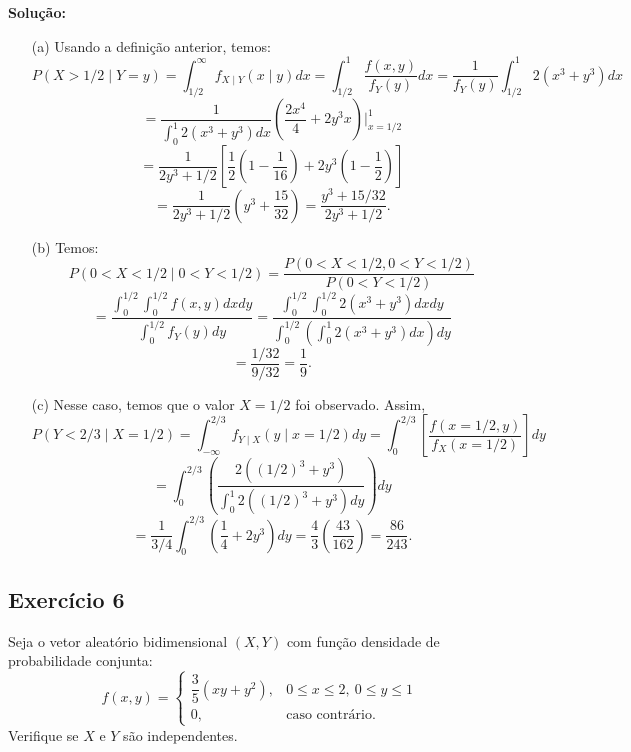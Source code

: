 \documentclass{article}
\begin{document}
\vspace{0.5cm}
\textbf{Solução:}
\begin{enumerate}
    \item[(a)] Usando a definição anterior, temos:
        $$
        P(X > 1/2 \mid Y = y) = \int_{1/2}^{\infty} f_{X\mid Y}(x\mid y) dx
        = \int_{1/2}^{1} \frac{f(x,y)}{f_Y(y)} dx
        = \frac{1}{f_Y(y)} \int_{1/2}^{1} 2(x^3 + y^3) dx
        $$
        $$
        = \frac{1}{\int_0^1 2(x^3 + y^3) dx} \left(\frac{2x^4}{4} + 2y^3x\right)\bigg|_{x=1/2}^{1}
        $$
        $$
        = \frac{1}{2y^3 + 1/2}\left[ \frac12\left(1 - \frac{1}{16}\right) + 2y^3\left(1 - \frac12\right) \right]
        $$
        $$
        = \frac{1}{2y^3 + 1/2}\left( y^3 + \frac{15}{32} \right)
        = \frac{y^3 + 15/32}{2y^3 + 1/2}.
        $$
    \item[(b)] Temos:
        $$
        P(0 < X < 1/2 \mid 0 < Y < 1/2)
        = \frac{P(0 < X < 1/2, 0 < Y < 1/2)}{P(0 < Y < 1/2)}
        $$
        $$
        = \frac{\int_0^{1/2}\int_0^{1/2} f(x,y) dx dy}{\int_0^{1/2} f_Y(y) dy}
        = \frac{\int_0^{1/2}\int_0^{1/2} 2(x^3 + y^3) dx dy}
        {\int_0^{1/2} \left(\int_0^1 2(x^3 + y^3) dx\right) dy}
        $$
        $$
        = \frac{1/32}{9/32}
        = \frac19.
        $$
    \item[(c)] Nesse caso, temos que o valor $X = 1/2$ foi observado. Assim,
        $$
        P(Y < 2/3 \mid X = 1/2)
        = \int_{-\infty}^{2/3} f_{Y\mid X}(y\mid x=1/2) dy
        = \int_0^{2/3} 
        \left[\frac{f(x=1/2,y)}{f_X(x=1/2)}\right] dy
        $$
        $$
        = \int_0^{2/3}
        \left(
        \frac{2((1/2)^3 + y^3)}
        {\int_0^1 2((1/2)^3 + y^3) dy}
        \right) dy
        $$
        $$
        = \frac{1}{3/4}\int_0^{2/3}\left(\frac14 + 2y^3\right) dy
        = \frac{4}{3}\left(\frac{43}{162}\right)
        = \frac{86}{243}.
        $$
\end{enumerate}

\subsection{Exercício 6}
Seja o vetor aleatório bidimensional $(X, Y)$ com função densidade de probabilidade conjunta:
    $$
    f(x,y) = 
    \begin{cases}
    \dfrac{3}{5}(xy + y^2), & 0 \le x \le 2,\ 0 \le y \le 1\\[6pt]
    0, & \text{caso contrário}.
    \end{cases}
    $$
Verifique se $X$ e $Y$ são independentes.
\end{document}
